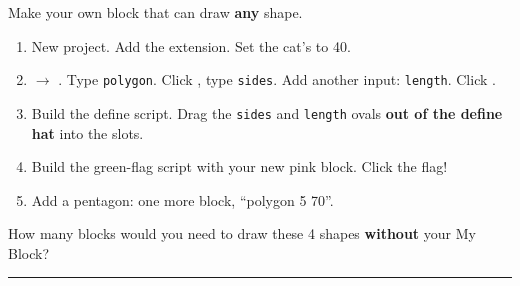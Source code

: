 \begin{exercise}
Make your own block that can draw \textbf{any} shape.
\begin{enumerate}[leftmargin=1.4em,itemsep=1pt]
  \item New project. Add the  extension. Set the cat's  to 40.
  \item {} $\rightarrow$ . Type \texttt{polygon}. Click , type \texttt{sides}. Add another input: \texttt{length}. Click .
  \item Build the define script. Drag the \texttt{sides} and \texttt{length} ovals \textbf{out of the define hat} into the slots.
  \item Build the green-flag script with your new pink block. Click the flag!
  \item Add a pentagon: one more block, \enquote{polygon 5 70}.
\end{enumerate}
\begin{center}
\begin{scratch}[scale=0.78]
\end{scratch}
\hspace{0.8cm}
\begin{scratch}[scale=0.78]
\end{scratch}
\end{center}
How many blocks would you need to draw these 4 shapes \textbf{without} your My Block? \rule{2cm}{0.4pt}
\end{exercise}

